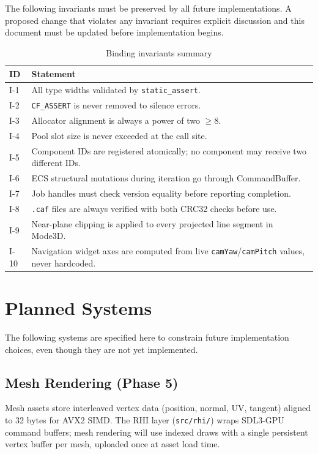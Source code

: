 \documentclass[12pt, a4paper]{report}
\theoremstyle{definition}
\theoremstyle{remark}
\begin{document}
The following invariants must be preserved by all future implementations.
A proposed change that violates any invariant requires explicit discussion
and this document must be updated before implementation begins.

\begin{table}[H]
\centering
\caption{Binding invariants summary}
\begin{tabular}{lp{9cm}}
\toprule
\textbf{ID} & \textbf{Statement} \\
\midrule
I-1 & All type widths validated by \texttt{static\_assert}. \\
I-2 & \texttt{CF\_ASSERT} is never removed to silence errors. \\
I-3 & Allocator alignment is always a power of two $\geq 8$. \\
I-4 & Pool slot size is never exceeded at the call site. \\
I-5 & Component IDs are registered atomically; no component may receive two different IDs. \\
I-6 & ECS structural mutations during iteration go through CommandBuffer. \\
I-7 & Job handles must check version equality before reporting completion. \\
I-8 & \texttt{.caf} files are always verified with both CRC32 checks before use. \\
I-9 & Near-plane clipping is applied to every projected line segment in Mode3D. \\
I-10 & Navigation widget axes are computed from live \texttt{camYaw}/\texttt{camPitch} values, never hardcoded. \\
\bottomrule
\end{tabular}
\end{table}

\section{Planned Systems}

The following systems are specified here to constrain future
implementation choices, even though they are not yet implemented.

\subsection{Mesh Rendering (Phase 5)}

Mesh assets store interleaved vertex data (position, normal, UV, tangent)
aligned to 32 bytes for AVX2 SIMD. The RHI layer (\texttt{src/rhi/})
wraps SDL3-GPU command buffers; mesh rendering will use indexed draws
with a single persistent vertex buffer per mesh, uploaded once at asset
load time.
\end{document}
